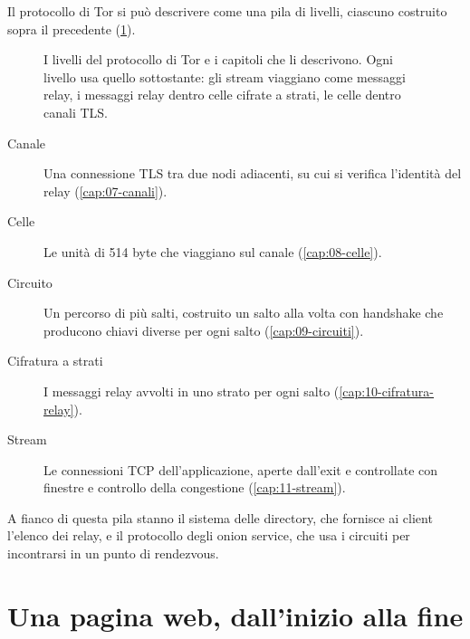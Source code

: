 Il protocollo di Tor si può descrivere come una pila di livelli, ciascuno costruito sopra il precedente (\cref{fig:arch-livelli}).

\begin{figure}[htbp]
\centering

\caption{I livelli del protocollo di Tor e i capitoli che li descrivono. Ogni livello usa quello sottostante: gli stream viaggiano come messaggi relay, i messaggi relay dentro celle cifrate a strati, le celle dentro canali TLS.}
\label{fig:arch-livelli}
\end{figure}

\begin{description}
  \item[Canale] Una connessione TLS tra due nodi adiacenti, su cui si verifica l'identità del relay (\cref{cap:07-canali}).
  \item[Celle] Le unità di 514 byte che viaggiano sul canale (\cref{cap:08-celle}).
  \item[Circuito] Un percorso di più salti, costruito un salto alla volta con handshake che producono chiavi diverse per ogni salto (\cref{cap:09-circuiti}).
  \item[Cifratura a strati] I messaggi relay avvolti in uno strato per ogni salto (\cref{cap:10-cifratura-relay}).
  \item[Stream] Le connessioni TCP dell'applicazione, aperte dall'exit e controllate con finestre e controllo della congestione (\cref{cap:11-stream}).
\end{description}
A fianco di questa pila stanno il sistema delle directory, che fornisce ai client l'elenco dei relay, e il protocollo degli onion service, che usa i circuiti per incontrarsi in un punto di rendezvous.

\section{Una pagina web, dall'inizio alla fine}\label{sec:arch-percorso}

